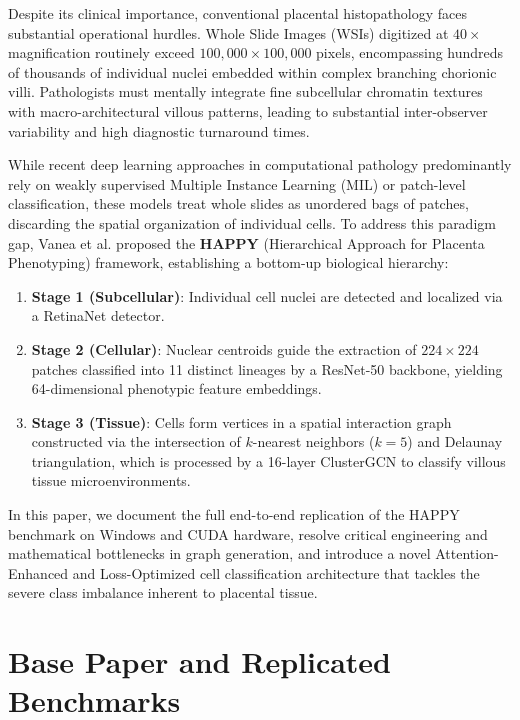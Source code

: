 \documentclass[a4paper,fleqn]{cas-sc}
\begin{document}
Despite its clinical importance, conventional placental histopathology faces substantial operational hurdles. Whole Slide Images (WSIs) digitized at $40\times$ magnification routinely exceed $100,000 \times 100,000$ pixels, encompassing hundreds of thousands of individual nuclei embedded within complex branching chorionic villi. Pathologists must mentally integrate fine subcellular chromatin textures with macro-architectural villous patterns, leading to substantial inter-observer variability and high diagnostic turnaround times. 

While recent deep learning approaches in computational pathology predominantly rely on weakly supervised Multiple Instance Learning (MIL) or patch-level classification, these models treat whole slides as unordered bags of patches, discarding the spatial organization of individual cells. To address this paradigm gap, Vanea et al. \cite{vanea2024hierarchical} proposed the \textbf{HAPPY} (Hierarchical Approach for Placenta Phenotyping) framework, establishing a bottom-up biological hierarchy:
\begin{enumerate}
    \item \textbf{Stage 1 (Subcellular)}: Individual cell nuclei are detected and localized via a RetinaNet detector.
    \item \textbf{Stage 2 (Cellular)}: Nuclear centroids guide the extraction of $224 \times 224$ patches classified into 11 distinct lineages by a ResNet-50 backbone, yielding 64-dimensional phenotypic feature embeddings.
    \item \textbf{Stage 3 (Tissue)}: Cells form vertices in a spatial interaction graph constructed via the intersection of $k$-nearest neighbors ($k=5$) and Delaunay triangulation, which is processed by a 16-layer ClusterGCN to classify villous tissue microenvironments.
\end{enumerate}

In this paper, we document the full end-to-end replication of the HAPPY benchmark on Windows and CUDA hardware, resolve critical engineering and mathematical bottlenecks in graph generation, and introduce a novel Attention-Enhanced and Loss-Optimized cell classification architecture that tackles the severe class imbalance inherent to placental tissue.

\section{Base Paper and Replicated Benchmarks}
\end{document}
